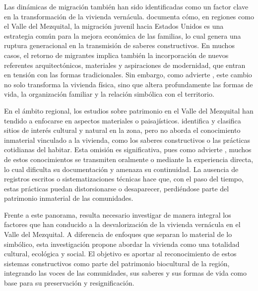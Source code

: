 Las dinámicas de migración también han sido identificadas como un factor clave en la transformación de la vivienda vernácula. \cite{baez2012pueblos} documenta cómo, en regiones como el Valle del Mezquital, la migración juvenil hacia Estados Unidos es una estrategia común para la mejora económica de las familias, lo cual genera una ruptura generacional en la transmisión de saberes constructivos. En muchos casos, el retorno de migrantes implica también la incorporación de nuevos referentes arquitectónicos, materiales y aspiraciones de modernidad, que entran en tensión con las formas tradicionales. Sin embargo, como advierte \citeauthor{gandara2000}, este cambio no solo transforma la vivienda física, sino que altera profundamente las formas de vida, la organización familiar y la relación simbólica con el territorio.

En el ámbito regional, los estudios sobre patrimonio en el Valle del Mezquital han tendido a enfocarse en aspectos materiales o paisajísticos. \cite{rodriguezestudio} identifica y clasifica sitios de interés cultural y natural en la zona, pero no aborda el conocimiento inmaterial vinculado a la vivienda, como los saberes constructivos o las prácticas cotidianas del habitar. Esta omisión es significativa, pues como advierte \cite{guerrero2007arquitectura}, muchos de estos conocimientos se transmiten oralmente o mediante la experiencia directa, lo cual dificulta su documentación y amenaza su continuidad. La ausencia de registros escritos o sistematizaciones técnicas hace que, con el paso del tiempo, estas prácticas puedan distorsionarse o desaparecer, perdiéndose parte del patrimonio inmaterial de las comunidades.

Frente a este panorama, resulta necesario investigar de manera integral los factores que han conducido a la desvalorización de la vivienda vernácula en el Valle del Mezquital. A diferencia de enfoques que separan lo material de lo simbólico, esta investigación propone abordar la vivienda como una totalidad cultural, ecológica y social. El objetivo es aportar al reconocimiento de estos sistemas constructivos como parte del patrimonio biocultural de la región, integrando las voces de las comunidades, sus saberes y sus formas de vida como base para su preservación y resignificación.
